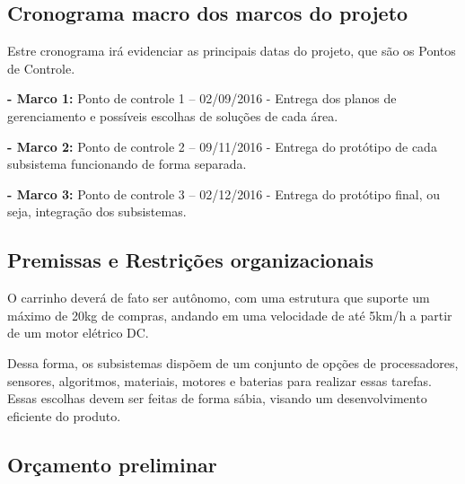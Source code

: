 \begin{apendicesenv}
\subsection{Cronograma macro dos marcos do projeto}

Estre cronograma irá evidenciar as principais datas do projeto, que são os Pontos de Controle.
\newline
\par \textbf{- Marco 1:} 
Ponto de controle 1 – 02/09/2016 - Entrega dos planos de gerenciamento e possíveis escolhas de soluções de cada área.
\newline
\par \textbf{- Marco 2:} 
Ponto de controle 2 – 09/11/2016 - Entrega do protótipo de cada subsistema funcionando de forma separada.
\newline
\par \textbf{- Marco 3:}
Ponto de controle 3 – 02/12/2016 - Entrega do protótipo final, ou seja, integração dos subsistemas.

\subsection{Premissas e Restrições organizacionais}

O carrinho deverá de fato ser autônomo, com uma estrutura que suporte um máximo de 20kg de compras, andando em uma velocidade de até 5km/h a partir de um motor elétrico DC. 

\par Dessa forma, os subsistemas dispõem de um conjunto de opções de processadores, sensores, algoritmos, materiais, motores e baterias para realizar essas tarefas. Essas escolhas devem ser feitas de forma sábia, visando um desenvolvimento eficiente do produto.

\newpage
\subsection{Orçamento preliminar}


\end{apendicesenv}
